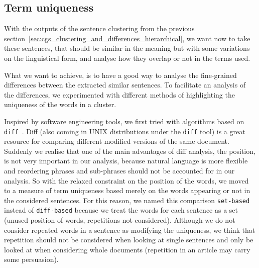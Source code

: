 
\subsection{\statusgreen Term uniqueness}
\label{sec:cgs_clustering_and_differences_uniqueness}

With the outputs of the sentence clustering from the previous section~\ref{sec:cgs_clustering_and_differences_hierarchical}, we want now to take these sentences, that should be similar in the meaning but with some variations on the linguistical form, and analyse how they overlap or not in the terms used.

What we want to achieve, is to have a good way to analyse the fine-grained differences between the extracted similar sentences.
To facilitate an analysis of the differences, we experimented with different methods of highlighting the uniqueness of the words in a cluster.

Inspired by software engineering tools, we first tried with algorithms based on \texttt{diff}~\citep{myers1986ano}. Diff (also coming in UNIX distributions under the \texttt{diff} tool) is a great resource for comparing different modified versions of the same document.
Suddenly we realise that one of the main advantages of diff analysis, the position, is not very important in our analysis, because natural language is more flexible and reordering phrases and sub-phrases should not be accounted for in our analysis. So with the relaxed constraint on the position of the words, we moved to a measure of term uniqueness based merely on the words appearing or not in the considered sentences. For this reason, we named this comparison \texttt{set-based} instead of \texttt{diff-based} because we treat the words for each sentence as a set (unused position of words, repetitions not considered). Although we do not consider repeated words in a sentence as modifying the uniqueness, we think that repetition should not be considered when looking at single sentences and only be looked at when considering whole documents (repetition in an article may carry some persuasion).

